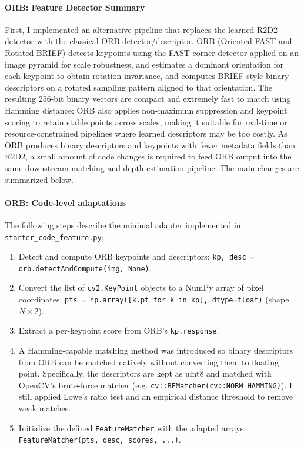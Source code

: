 \documentclass{rapport}
\begin{document}
\paragraph{ORB: Feature Detector Summary}
First, I implemented an alternative pipeline that replaces the learned R2D2 detector 
with the classical ORB detector/descriptor. ORB (Oriented FAST and Rotated BRIEF) \cite{ORB} detects keypoints using the FAST corner detector applied on an image 
pyramid for scale robustness, and estimates a dominant orientation for each keypoint to obtain rotation invariance, and 
computes BRIEF-style binary descriptors on a rotated sampling pattern aligned to that orientation. The resulting 256-bit binary vectors are compact and 
extremely fast to match using Hamming distance; ORB also applies non-maximum suppression and keypoint scoring to retain stable points across scales, making 
it suitable for real-time or resource-constrained pipelines where learned descriptors may be too costly.
As ORB produces binary descriptors and keypoints with fewer metadata fields than R2D2, a small amount of code changes is required
to feed ORB output into the same downstream matching and depth estimation pipeline. The main changes are summarized below.

\paragraph{ORB: Code-level adaptations}
The following steps describe the minimal adapter implemented in \texttt{starter\_code\_feature.py}:
\begin{enumerate}
    \item Detect and compute ORB keypoints and descriptors:
        	\texttt{kp, desc = orb.detectAndCompute(img, None)}.
    \item Convert the list of \texttt{cv2.KeyPoint} objects to a NumPy array of pixel coordinates:
        	\texttt{pts = np.array([k.pt for k in kp], dtype=float)} (shape $N\times 2$).
    \item Extract a per-keypoint score from ORB's \texttt{kp.response}.
    \item A Hamming-capable matching method was introduced so binary descriptors from ORB can be matched natively without converting them to floating point.
    Specifically, the descriptors are kept as uint8 and matched with OpenCV's brute-force matcher (e.g. \texttt{cv::BFMatcher(cv::NORM\_HAMMING)}).
    I still applied Lowe's ratio test and an empirical distance threshold to remove weak matches.
    \item Initialize the defined \texttt{FeatureMatcher} with the adapted arrays: \texttt{FeatureMatcher(pts, desc, scores, ...)}.
\end{enumerate}
\end{document}
